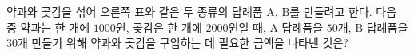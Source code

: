\noindent\begin{minipage}[t]{0.58\linewidth}\vspace{0pt}\raggedright 약과와 곶감을 섞어 오른쪽 표와 같은 두 종류의 답례품 $\mathrm{A}$, $\mathrm{B}$를 만들려고 한다. 다음 중 약과는 한 개에 $1000$원, 곶감은 한 개에 $2000$원일 때, $\mathrm{A}$ 답례품을 $50$개, $\mathrm{B}$ 답례품을 $30$개 만들기 위해 약과와 곶감을 구입하는 데 필요한 금액을 나타낸 것은?\end{minipage}\hfill\begin{minipage}[t]{0.4\linewidth}\vspace{0pt}\centering \resizebox{\ifdim\width>\linewidth\linewidth\else\width\fi}{!}{}\end{minipage}\par

